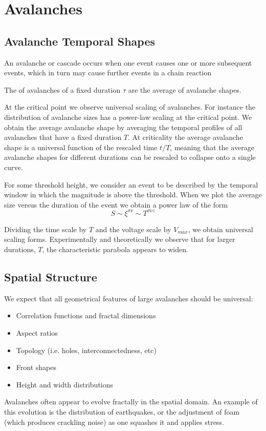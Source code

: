 \documentclass[12pt, a4paper, oneside, openright, titlepage]{book}
\begin{document}
\section{Avalanches}

\subsection{Avalanche Temporal Shapes}

\begin{note}
    An avalanche or cascade occurs when one event causes one or more subsequent events, which in turn may cause further events in a chain reaction
\end{note}

\begin{defn}
    The  of avalanches of a fixed duration $\tau$ are the average of avalanche shapes. 
\end{defn}

At the critical point we observe universal scaling of avalanches. For instance the distribution of avalanche sizes has a power-law scaling at the critical point. We obtain the average avalanche shape by averaging the temporal profiles of all avalanches that have a fixed duration $T$. At criticality the average avalanche shape is a universal function of the rescaled time $t/T$, meaning that the average avalanche shapes for different durations can be rescaled to collapse onto a single curve. 

For some threshold height, we consider an event to be described by the temporal window in which the magnitude is above the threshold. When we plot the average size versus the duration of the event we obtain a power law of the form $$S \sim \xi^{\sigma\nu}\sim T^{\sigma\nu z}$$

\begin{rmk}
    Dividing the time scale by $T$ and the voltage scale by $V_{max}$, we obtain universal scaling forms. Experimentally and theoretically we observe that for larger durations, $T$, the characteristic parabola appears to widen.
\end{rmk}

\subsection{Spatial Structure}

We expect that all geometrical features of large avalanches should be universal: 
\begin{itemize}
    \item Correlation functions and fractal dimensions
    \item Aspect ratios
    \item Topology (i.e. holes,  interconnectedness, etc)
    \item Front shapes
    \item Height and width distributions
\end{itemize}
Avalanches often appear to evolve fractally in the spatial domain. An example of this evolution is the distribution of earthquakes, or the adjustment of foam (which produces crackling noise) as one squashes it and applies stress.
\end{document}
